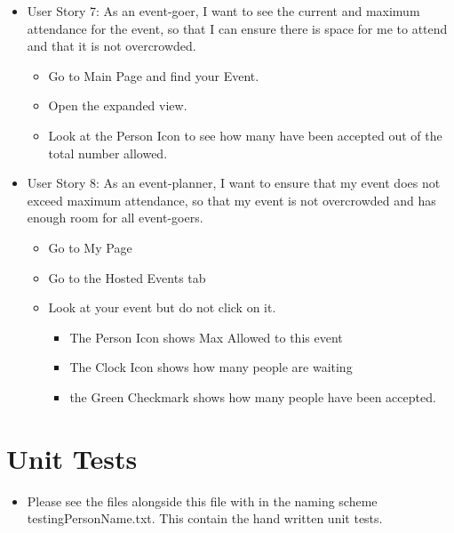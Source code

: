 \documentclass[10pt]{article}
\newcommand{\fancysec}[2] {{\color{primary}\section{#1} \label{sec:#2}}}
\begin{document}
\begin{itemize}
			\item User Story 7: As an event-goer, I want to see the current and maximum attendance for the event, so that I can ensure there is space for me to attend and that it is not overcrowded.
			\begin{itemize}
				\item Go to Main Page and find your Event.
				\item Open the expanded view.
				\item Look at the Person Icon to see how many have been accepted out of the total number allowed.
			\end{itemize}
			
			\item User Story 8: As an event-planner, I want to ensure that my event does not exceed maximum attendance, so that my event is not overcrowded and has enough room for all event-goers.
			\begin{itemize}
				\item Go to My Page
				\item Go to the Hosted Events tab
				\item Look at your event but do not click on it.
				\begin{itemize}
					\item The Person Icon shows Max Allowed to this event
					\item The Clock Icon shows how many people are waiting
					\item the Green Checkmark shows how many people have been accepted.
				\end{itemize}
			\end{itemize}
			
		\end{itemize}
	\fancysec{Unit Tests}{unitTest}
		\begin{itemize}
			\item Please see the files alongside this file with in the naming scheme testingPersonName.txt. This contain the hand written unit tests.
		\end{itemize}
	
	
\end{document}
